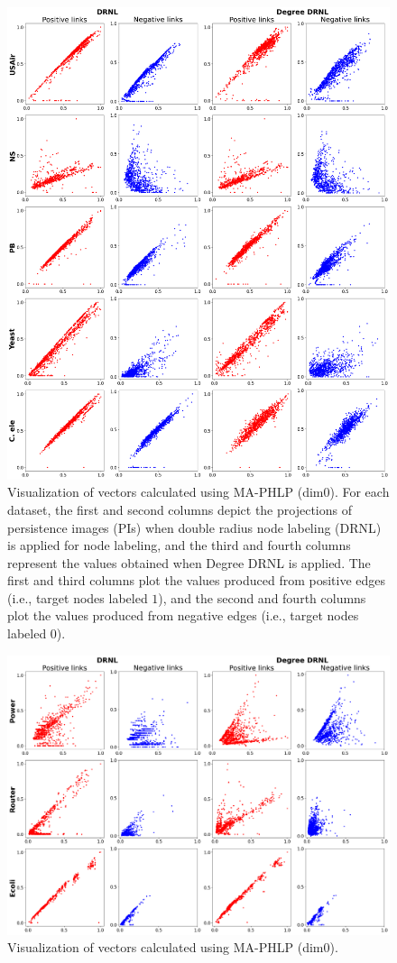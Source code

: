 \begin{figure}[!htbp]
\centering
   \includegraphics[width=0.9\linewidth]{figures/drnl_degdrnl_posneg1.pdf}
   \hfil
   \caption{Visualization of vectors calculated using MA-PHLP (dim0). For each dataset, the first and second columns depict the projections of persistence images (PIs) when double radius node labeling (DRNL) is applied for node labeling, and the third and fourth columns represent the values obtained when Degree DRNL is applied. 
   The first and third columns plot the values produced from positive edges (i.e., target nodes labeled $1$), and the second and fourth columns plot the values produced from negative edges (i.e., target nodes labeled $0$). }
   \label{fig:posneg1}
\end{figure}
\begin{figure}[!htbp]
\centering
   \includegraphics[width=0.9\linewidth]{figures/drnl_degdrnl_posneg2.pdf}
   \hfil
   \caption{Visualization of vectors calculated using MA-PHLP (dim0).}
   \label{fig:posneg2}
\end{figure}


